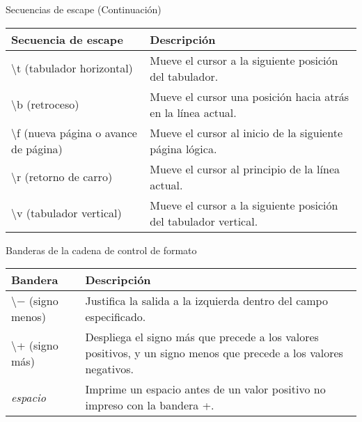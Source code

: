 \begin{frame}[t]{Secuencias de escape (Continuación)}
\vspace{-4mm}
\small
\begin{center}
	\begin{tabular}{p{4cm}p{6cm}}
		\toprule
		\textbf{Secuencia de escape} & \textbf{Descripción}\\
		\midrule 
		\textbackslash t (tabulador horizontal) & Mueve el cursor a la siguiente posición del tabulador.\\
		\textbackslash b (retroceso) & Mueve el cursor una posición hacia atrás en la línea actual.\\
		\textbackslash f (nueva página o avance de página) & Mueve el cursor al inicio de la siguiente página l\'ogica.\\
		\textbackslash r (retorno de carro) & Mueve el cursor al principio de la línea actual.\\
		\textbackslash v (tabulador vertical) & Mueve el cursor a la siguiente posición del tabulador vertical.\\
		\bottomrule
	\end{tabular}
\end{center}
\end{frame}

\begin{frame}{Banderas de la cadena de control de formato}
\small
\centering
\begin{tabular}{lp{6cm}}
	\toprule
	\textbf{Bandera} & \textbf{Descripción}\\
	\midrule 
	\textbackslash$-$ (signo menos) & Justifica la salida a la izquierda dentro del campo especificado.\\ 
	\hline
	\textbackslash+ (signo más) & Despliega el signo más que precede a los valores positivos, y un signo menos que precede a los valores negativos.\\
	\hline
	\textit{espacio} & Imprime un espacio antes de un valor positivo no impreso con la bandera +.\\
	\bottomrule
\end{tabular}
\end{frame}

